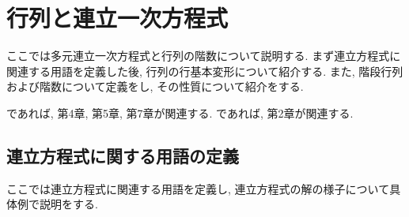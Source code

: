 




\chapter{行列と連立一次方程式}
\label{chap:systemoflineq}
ここでは多元連立一次方程式と行列の階数について説明する.
まず連立方程式に関連する用語を定義した後,
行列の行基本変形について紹介する.
また, 階段行列および階数について定義をし,
その性質について紹介をする.

\cite{978-4-7806-0772-7}であれば,
第4章, 第5章, 第7章が関連する.
\cite{978-4-7806-0164-0}であれば,
第2章が関連する.


\section{連立方程式に関する用語の定義}
ここでは連立方程式に関連する用語を定義し,
連立方程式の解の様子について具体例で説明をする.

